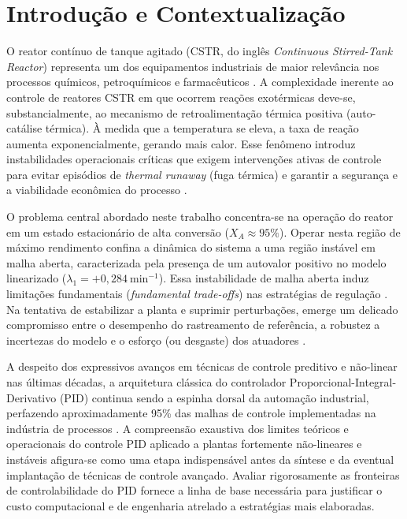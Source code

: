 \chapter{Introdução e Contextualização}
\label{cap:introducao}

O reator contínuo de tanque agitado (CSTR, do inglês \textit{Continuous Stirred-Tank Reactor}) representa um dos equipamentos industriais de maior relevância nos processos químicos, petroquímicos e farmacêuticos \cite{Bequette2003, Luyben2007}. A complexidade inerente ao controle de reatores CSTR em que ocorrem reações exotérmicas deve-se, substancialmente, ao mecanismo de retroalimentação térmica positiva (auto-catálise térmica). À medida que a temperatura se eleva, a taxa de reação aumenta exponencialmente, gerando mais calor. Esse fenômeno introduz instabilidades operacionais críticas que exigem intervenções ativas de controle para evitar episódios de \textit{thermal runaway} (fuga térmica) e garantir a segurança e a viabilidade econômica do processo \cite{Seborg2016}.

O problema central abordado neste trabalho concentra-se na operação do reator em um estado estacionário de alta conversão ($X_A \approx 95\%$). Operar nesta região de máximo rendimento confina a dinâmica do sistema a uma região instável em malha aberta, caracterizada pela presença de um autovalor positivo no modelo linearizado ($\lambda_1 = +0,284\ \si{\minute^{-1}}$). Essa instabilidade de malha aberta induz limitações fundamentais (\textit{fundamental trade-offs}) nas estratégias de regulação \cite{VanHeerden1953, Uppal1974}. Na tentativa de estabilizar a planta e suprimir perturbações, emerge um delicado compromisso entre o desempenho do rastreamento de referência, a robustez a incertezas do modelo e o esforço (ou desgaste) dos atuadores \cite{Marlin2000, Smith2005}.

A despeito dos expressivos avanços em técnicas de controle preditivo e não-linear nas últimas décadas, a arquitetura clássica do controlador Proporcional-Integral-Derivativo (PID) continua sendo a espinha dorsal da automação industrial, perfazendo aproximadamente 95\% das malhas de controle implementadas na indústria de processos \cite{Astrom2006}. A compreensão exaustiva dos limites teóricos e operacionais do controle PID aplicado a plantas fortemente não-lineares e instáveis afigura-se como uma etapa indispensável antes da síntese e da eventual implantação de técnicas de controle avançado. Avaliar rigorosamente as fronteiras de controlabilidade do PID fornece a linha de base necessária para justificar o custo computacional e de engenharia atrelado a estratégias mais elaboradas.

